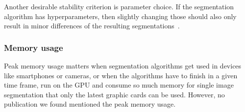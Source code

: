Another desirable stability criterion is parameter choice. If the
segmentation algorithm has hyperparameters, then slightly changing those should
also only result in minor differences of the resulting
segmentations~\cite{pantofaru2005comparison}.


\subsubsection{Memory usage}
Peak memory usage matters when segmentation algorithms get used in devices like
smartphones or cameras, or when the algorithms have to finish in a given time
frame, run on the \gls{GPU} and consume so much memory for single image
segmentation that only the latest graphic cards can be used. However, no
publication we found mentioned the peak memory usage.
